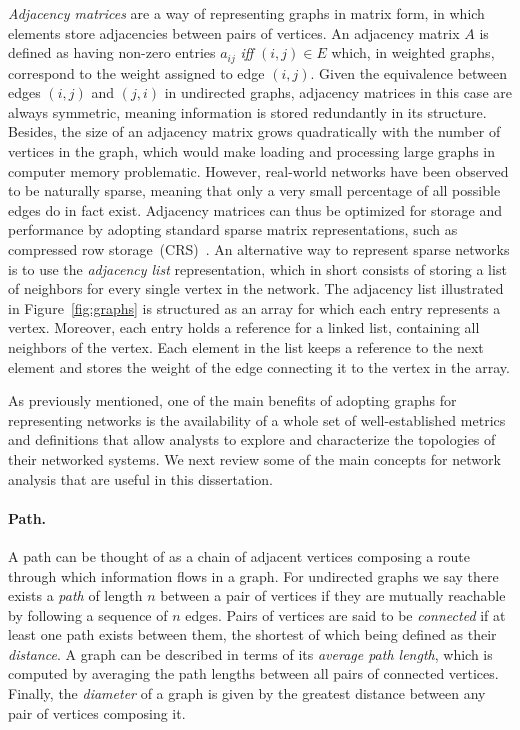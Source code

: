 \textit{Adjacency matrices} are a way of representing graphs in matrix form, in which elements store adjacencies between pairs of vertices.
An adjacency matrix $A$ is defined as having non-zero entries $a_{i j}$\textit{ iff }  $(i,j)\in E$ which, in weighted graphs, correspond to the weight assigned to edge $(i,j)$.
Given the equivalence between edges $(i,j)$ and $(j,i)$ in undirected graphs, adjacency matrices in this case are always symmetric, meaning information is stored redundantly in its structure.
%
Besides, the size of an adjacency matrix grows quadratically with the number of vertices in the graph, which would make loading and processing large graphs in computer memory problematic.
However, real-world networks have been observed to be naturally sparse, meaning that only a very small percentage of all possible edges do in fact exist.
Adjacency matrices can thus be optimized for storage and performance by adopting standard sparse matrix representations, such as compressed row storage~(CRS)~\cite{Saad2003}.
An alternative way to represent sparse networks is to use the \textit{adjacency list} representation, which in short consists of storing a list of neighbors for every single vertex in the network. 
The adjacency list illustrated in Figure~\ref{fig:graphs} is structured as an array for which each entry represents a vertex.
Moreover, each entry holds a reference for a linked list, containing all neighbors of the vertex. Each element in the list keeps a reference to the next element and stores the weight of the edge connecting it to the vertex in the array.


As previously mentioned, one of the main benefits of adopting graphs for representing networks is the availability of a whole set of well-established metrics and definitions that allow analysts to explore and characterize the topologies of their networked systems.
We next review some of the main concepts for network analysis that are useful in this dissertation.


\paragraph*{Path.}
A path can be thought of as a chain of adjacent vertices composing a route through which information flows in a graph.
For undirected graphs we say there exists a \textit{path} of length $n$ between a pair of vertices if they are mutually reachable by following a sequence of $n$ edges.
Pairs of vertices are said to be \textit{connected} if at least one path exists between them, the shortest of which being defined as their \textit{distance}.
A graph can be described in terms of its \textit{average path length}, which is computed by averaging the path lengths between all pairs of connected vertices.
Finally, the \textit{diameter} of a graph is given by the greatest distance between any pair of vertices composing it.


